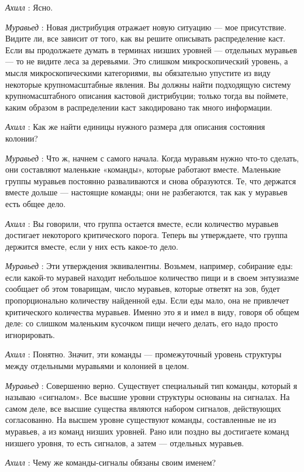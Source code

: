 \documentclass[../main.tex]{subfiles}
\begin{document}
\begin{dialogue}
\emph{Ахилл} : Ясно.

\emph{Муравьед} : Новая дистрибуция отражает новую ситуацию --- мое присутствие. Видите ли, все зависит от того, как вы решите описывать распределение каст. Если вы продолжаете думать в терминах низших уровней --- отдельных муравьев --- то не видите леса за деревьями. Это слишком микроскопический уровень, а мысля микроскопическими категориями, вы обязательно упустите из виду некоторые крупномасштабные явления. Вы должны найти подходящую систему крупномасштабного описания кастовой дистрибуции; только тогда вы поймете, каким образом в распределении каст закодировано так много информации.

\emph{Ахилл} : Как же найти единицы нужного размера для описания состояния колонии?

\emph{Муравьед} : Что ж, начнем с самого начала. Когда муравьям нужно что-то сделать, они составляют маленькие «команды», которые работают вместе. Маленькие группы муравьев постоянно разваливаются и снова образуются. Те, что держатся вместе дольше --- настоящие команды; они не разбегаются, так как у муравьев есть общее дело.

\emph{Ахилл} : Вы говорили, что группа остается вместе, если количество муравьев достигает некоторого критического порога. Теперь вы утверждаете, что группа держится вместе, если у них есть какое-то дело.

\emph{Муравьед} : Эти утверждения эквивалентны. Возьмем, например, собирание еды: если какой-то муравей находит небольшое количество пищи и в своем энтузиазме сообщает об этом товарищам, число муравьев, которые ответят на зов, будет пропорционально количеству найденной еды. Если еды мало, она не привлечет критического количества муравьев. Именно это я и имел в виду, говоря об общем деле: со слишком маленьким кусочком пищи нечего делать, его надо просто игнорировать.

\emph{Ахилл} : Понятно. Значит, эти команды --- промежуточный уровень структуры между отдельными муравьями и колонией в целом.

\emph{Муравьед} : Совершенно верно. Существует специальный тип команды, который я называю «сигналом». Все высшие уровни структуры основаны на сигналах. На самом деле, все высшие существа являются набором сигналов, действующих согласованно. На высшем уровне существуют команды, составленные не из муравьев, а из команд низших уровней. Рано или поздно вы достигаете команд низшего уровня, то есть сигналов, а затем --- отдельных муравьев.

\emph{Ахилл} : Чему же команды-сигналы обязаны своим именем?


\end{dialogue}
\end{document}
